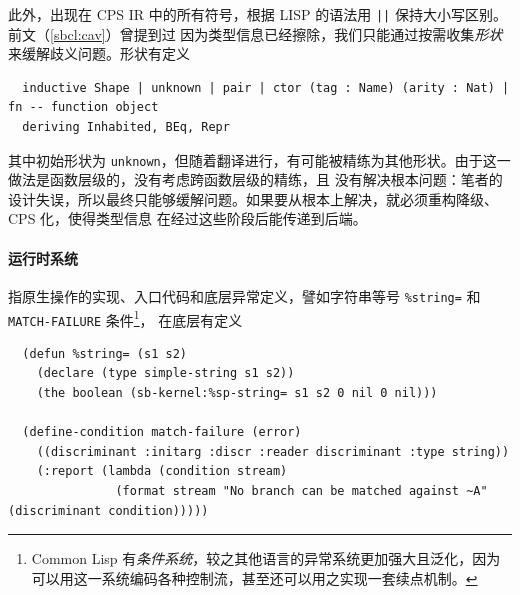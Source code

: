 \documentclass[a4paper, 11pt]{article}
\theoremstyle{remark}\newtheorem*{remark}{Remark}
\theoremstyle{definition}\newtheorem*{definition}{Definition}
\begin{document}
此外，出现在 CPS IR 中的所有符号，根据 LISP 的语法用 \texttt{||} 保持大小写区别。前文（\autoref{sbcl:cav}）曾提到过
因为类型信息已经擦除，我们只能通过按需收集\emph{形状}来缓解歧义问题。形状有定义
\begin{verbatim}
  inductive Shape | unknown | pair | ctor (tag : Name) (arity : Nat) | fn -- function object
  deriving Inhabited, BEq, Repr
\end{verbatim}
其中初始形状为 \texttt{unknown}，但随着翻译进行，有可能被精练为其他形状。由于这一做法是函数层级的，没有考虑跨函数层级的精练，且
没有解决根本问题：笔者的设计失误，所以最终只能够缓解问题。如果要从根本上解决，就必须重构降级、CPS 化，使得类型信息
在经过这些阶段后能传递到后端。

\paragraph{运行时系统} 指原生操作的实现、入口代码和底层异常定义，譬如字符串等号 \texttt{\%string=}
和 \texttt{MATCH-FAILURE} 条件\footnote{
  Common Lisp 有\emph{条件系统}，较之其他语言的异常系统更加强大且泛化，因为
  可以用这一系统编码各种控制流，甚至还可以用之实现一套续点机制。
}，
在底层有定义
\begin{verbatim}
  (defun %string= (s1 s2)
    (declare (type simple-string s1 s2))
    (the boolean (sb-kernel:%sp-string= s1 s2 0 nil 0 nil)))

  (define-condition match-failure (error)
    ((discriminant :initarg :discr :reader discriminant :type string))
    (:report (lambda (condition stream)
               (format stream "No branch can be matched against ~A" (discriminant condition)))))
\end{verbatim}
\end{document}
